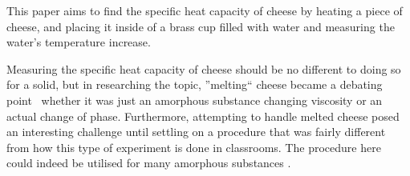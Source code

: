 This paper aims to find the specific heat capacity of cheese by heating a piece of cheese, and placing it inside of a brass cup filled with water and measuring the water's temperature increase.

Measuring the specific heat capacity of cheese should be no different to doing so for a solid, but in researching the topic, ''melting`` cheese became a debating point \textendash\ whether it was just an amorphous substance changing viscosity or an actual change of phase. Furthermore, attempting to handle melted cheese posed an interesting challenge until settling on a procedure that was fairly different from how this type of experiment is done in classrooms. The procedure here could indeed be utilised for many amorphous substances .
